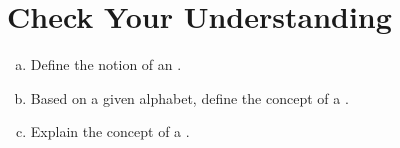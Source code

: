 \section{Check Your Understanding}
\begin{enumerate}[(a)]
\item Define the notion of an .
\item Based on a given alphabet, define the concept of a .
\item Explain the concept of a .
\end{enumerate}


